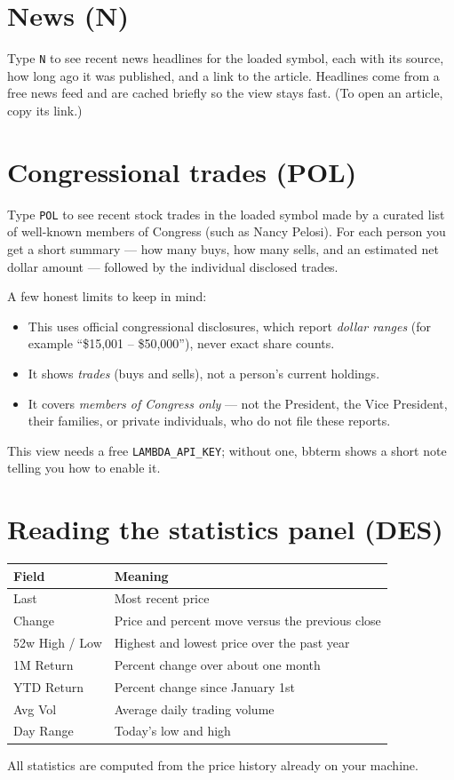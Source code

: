 \documentclass[11pt]{article}
\begin{document}
\section{News (N)}
Type \texttt{N} to see recent news headlines for the loaded symbol, each with its
source, how long ago it was published, and a link to the article. Headlines come
from a free news feed and are cached briefly so the view stays fast. (To open an
article, copy its link.)

\section{Congressional trades (POL)}
Type \texttt{POL} to see recent stock trades in the loaded symbol made by a
curated list of well-known members of Congress (such as Nancy Pelosi). For each
person you get a short summary --- how many buys, how many sells, and an estimated
net dollar amount --- followed by the individual disclosed trades.

A few honest limits to keep in mind:
\begin{itemize}
  \item This uses official congressional disclosures, which report \emph{dollar
  ranges} (for example ``\$15,001 -- \$50,000''), never exact share counts.
  \item It shows \emph{trades} (buys and sells), not a person's current holdings.
  \item It covers \emph{members of Congress only} --- not the President, the Vice
  President, their families, or private individuals, who do not file these
  reports.
\end{itemize}
This view needs a free \texttt{LAMBDA\_API\_KEY}; without one, bbterm shows a short
note telling you how to enable it.

\section{Reading the statistics panel (DES)}
\begin{center}
\begin{tabular}{ll}
\toprule
Field & Meaning \\
\midrule
Last & Most recent price \\
Change & Price and percent move versus the previous close \\
52w High / Low & Highest and lowest price over the past year \\
1M Return & Percent change over about one month \\
YTD Return & Percent change since January 1st \\
Avg Vol & Average daily trading volume \\
Day Range & Today's low and high \\
\bottomrule
\end{tabular}
\end{center}
All statistics are computed from the price history already on your machine.
\end{document}
